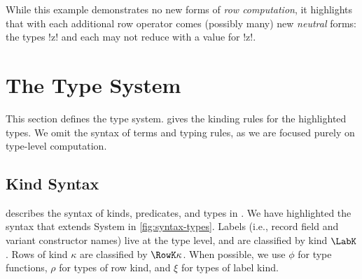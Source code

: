 While this example demonstrates no new forms of \emph{row computation}, it highlights that with each additional row operator comes (possibly many) new \emph{neutral} forms: the types !z!  and  each may not reduce with a value for !z!.





\section{The \Rome{} Type System}
\label{sec:Rome}
 This section defines the \Rome{} type system.  gives the kinding rules for the highlighted \Rome{} types. We omit the syntax of terms and typing rules, as we are focused purely on type-level computation.

\subsection{Kind Syntax}


 describes the syntax of kinds, predicates, and types in \Rome. We have highlighted the syntax that extends System \Fome in \cref{fig:syntax-types}. Labels (i.e., record field and variant constructor names) live at the type level, and are classified by kind $\LabK$. Rows of kind $\kappa$ are classified by $\RowK \kappa$. When possible, we use $\phi$ for type functions, $\rho$ for types of row kind, and $\xi$ for types of label kind. 


